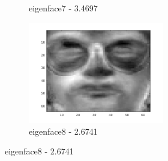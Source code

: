 \documentclass[a4paper]{article}
\begin{document}
\begin{figure}[H]
\begin{subfigure}[c]{0.24\textwidth}
        \caption{eigenface7 - 3.4697}
        \label{subfig:ex2_x7}
    \end{subfigure}
    \begin{subfigure}[c]{0.24\textwidth}
        \centering
        \includegraphics[width=0.65\textwidth]{images/ex2_x8.png}
        \caption{eigenface8 - 2.6741}
        \label{subfig:ex2_x8}
    \end{subfigure}


\end{figure}
\end{document}
